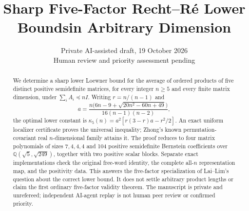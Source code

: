 \documentclass[11pt]{article}
\title{Sharp Five-Factor Recht--R\'e Lower Bounds\newline in Arbitrary Dimension}
\author{}
\date{Private AI-assisted draft, 19 October 2026\\Human review and priority assessment pending}
\newcommand{\Q}{\mathbb Q}
\begin{document}
\maketitle
\begin{abstract}
We determine a sharp lower Loewner bound for the average of ordered
products of five distinct positive semidefinite matrices, for every integer
$n\ge5$ and every finite matrix dimension, under $\sum_iA_i\preceq nI$.
Writing $r=n/(n-1)$ and
\[
 a=\frac{n\bigl(6n-9+\sqrt{20n^2-60n+49}\bigr)}{16(n-1)(n-2)},
\]
the optimal lower constant is
$\kappa_5(n)=a^2[r(3-r)a-r^2/2]$.
An exact uniform localizer certificate proves the universal inequality;
Zhong's known permutation-covariant real $n$-dimensional family attains it.
The proof reduces to four matrix polynomials of sizes $7,4,4,4$ and
104 positive semidefinite Bernstein coefficients over
$\Q(\sqrt5,\sqrt{249})$, together with two positive scalar blocks.
Separate exact implementations check the original free-word identity,
the complete all-$n$ representation map, and the positivity data.
This answers the five-factor specialization of Lai--Lim's question about
the correct lower bound. It does not settle arbitrary product lengths or
claim the first ordinary five-factor validity theorem.
The manuscript is private and unrefereed; independent AI-agent replay is
not human peer review or confirmed priority.
\end{abstract}
\end{document}
